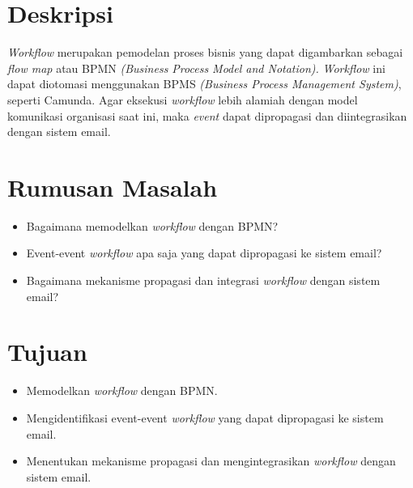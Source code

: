 \documentclass[a4paper,twoside]{article}
\begin{document}
\title{\@judultopik}
\author{\nama \textendash \@npm} 

\newcommand{\nama}{Lucky Senjaya Darmawan}
\newcommand{\@npm}{2012730009}
\newcommand{\@judultopik}{Studi dan Integrasi Workflow menggunakan BPMS dan Sistem Email} %
\newcommand{\jumpemb}{1} %
\newcommand{\tanggal}{20/12/2016}


\maketitle


\section{Deskripsi}
\textit{Workflow} merupakan pemodelan proses bisnis yang dapat digambarkan sebagai \textit{flow map} atau BPMN \textit{(Business Process Model and Notation).} \textit{Workflow} ini dapat diotomasi menggunakan BPMS \textit{(Business Process Management System)}, seperti Camunda. Agar eksekusi \textit{workflow} lebih alamiah dengan model komunikasi organisasi saat ini, maka \textit{event} dapat dipropagasi dan diintegrasikan dengan sistem email.

\section{Rumusan Masalah}
\begin{itemize}
	\item Bagaimana memodelkan \textit{workflow} dengan BPMN?
	\item Event-event \textit{workflow} apa saja yang dapat dipropagasi ke sistem email?
	\item Bagaimana mekanisme propagasi dan integrasi \textit{workflow} dengan sistem email?
\end{itemize}
\section{Tujuan}
\begin{itemize}
	\item Memodelkan \textit{workflow} dengan BPMN.
	\item Mengidentifikasi event-event \textit{workflow} yang dapat dipropagasi ke sistem email.
	\item Menentukan mekanisme propagasi dan mengintegrasikan \textit{workflow} dengan sistem email.
\end{itemize}
\end{document}
